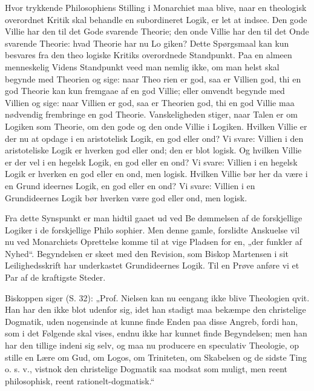 \documentclass[12pt]{book}
\newcommand{\opage}[1]{\marginnote{\footnotesize\textit{[#1]}}}
\begin{document}
Hvor trykkende Philosophiens Stilling i Monarchiet
maa blive, naar en theologisk overordnet Kritik skal behandle
en subordineret Logik, er let at indsee. Den gode Villie har
\opage{114}\setcounter{footnote}{0}%
den til det Gode svarende Theorie; den onde Villie har den
til det Onde svarende Theorie: hvad Theorie har nu Lo\-%
giken? Dette Spørgsmaal kan kun besvares fra den theo\-%
logiske Kritiks overordnede Standpunkt. Paa en almeen\-%
menneskelig Videns Standpunkt veed man nemlig ikke, om
man helst skal begynde med Theorien og sige: naar Theo\-%
rien er god, saa er Villien god, thi en god Theorie kan kun
fremgaae af en god Villie; eller omvendt begynde med
Villien og sige: naar Villien er god, saa er Theorien god,
thi en god Villie maa nødvendig frembringe en god Theorie.
Vanskeligheden stiger, naar Talen er om Logiken som Theorie,
om den gode og den onde Villie i Logiken. Hvilken Villie
er der nu at opdage i en aristotelisk Logik, en god eller
ond? Vi svare: Villien i den aristoteliske Logik er hverken
god eller ond; den er blot logisk. Og hvilken Villie er der
vel i en hegelsk Logik, en god eller en ond? Vi svare:
Villien i en hegelsk Logik er hverken en god eller en ond,
men logisk. Hvilken Villie bør her da være i en Grund\-%
ideernes Logik, en god eller en ond? Vi svare: Villien i en
Grundideernes Logik bør hverken være god eller ond, men logisk.

Fra dette Synspunkt er man hidtil gaaet ud ved Be\-%
dømmelsen af de forskjellige Logiker i de forskjellige Philo\-%
sophier. Men denne gamle, forslidte Anskuelse vil nu ved
Monarchiets Oprettelse komme til at vige Pladsen for en,
„der funkler af Nyhed“. Begyndelsen er skeet med den
Revision, som Biskop Martensen i sit Leilighedsskrift har
underkastet Grundideernes Logik. Til en Prøve anføre vi
et Par af de kraftigste Steder.

Biskoppen siger (S. 32): „Prof. Nielsen kan nu eengang
ikke blive Theologien qvit. Han har den ikke blot udenfor
sig, idet han stadigt maa bekæmpe den christelige Dogmatik,
uden nogensinde at kunne finde Enden paa disse Angreb,
fordi han, som i det Følgende skal vises, endnu ikke har
kunnet finde Begyndelsen; men han har den tillige indeni
\opage{115}\setcounter{footnote}{0}%
sig selv, og maa nu producere en speculativ Theologie, op\-%
stille en Lære om Gud, om Logos, om Triniteten, om
Skabelsen og de sidste Ting o. s. v., vistnok den christelige
Dogmatik saa modsat som muligt, men reent philosophisk,
reent rationelt-dogmatisk.“
\end{document}
